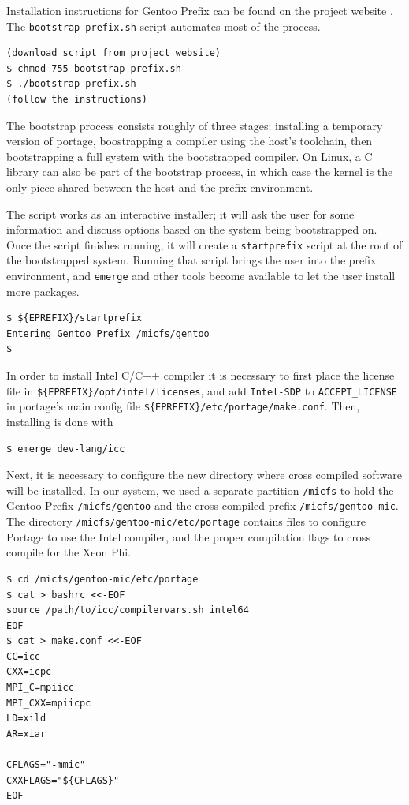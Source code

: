\documentclass[a4paper,conference]{IEEEtran}
\begin{document}
Installation instructions for Gentoo Prefix can be found on the project
website \cite{gentoo:prefix}. The \texttt{bootstrap-prefix.sh} script
automates most of the process.
\begin{verbatim}
(download script from project website)
$ chmod 755 bootstrap-prefix.sh
$ ./bootstrap-prefix.sh
(follow the instructions)
\end{verbatim}

The bootstrap process consists roughly of three stages: installing a
temporary version of portage, boostrapping a compiler using the host's
toolchain, then bootstrapping a full system with the bootstrapped
compiler. On Linux, a C library can also be part of the bootstrap
process, in which case the kernel is the only piece shared between the
host and the prefix environment.

The script works as an interactive installer; it will ask the user for
some information and discuss options based on the system being
bootstrapped on. Once the script finishes running, it will create a
\texttt{startprefix} script at the root of the bootstrapped system.
Running that script brings the user into the prefix environment, and
\texttt{emerge} and other tools become available to let the user install
more packages.
\begin{verbatim}
$ ${EPREFIX}/startprefix
Entering Gentoo Prefix /micfs/gentoo
$
\end{verbatim}
In order to install Intel C/C++ compiler it is necessary to first place
the license file in \verb|${EPREFIX}/opt/intel/licenses|, and add
\verb|Intel-SDP| to \verb|ACCEPT_LICENSE| in portage's main config file
\verb|${EPREFIX}/etc/portage/make.conf|. Then, installing is done with
\begin{verbatim}
$ emerge dev-lang/icc
\end{verbatim}

Next, it is necessary to configure the new directory where cross
compiled software will be installed. In our system, we used a separate
partition \verb|/micfs| to hold the Gentoo Prefix \verb|/micfs/gentoo|
and the cross compiled prefix \verb|/micfs/gentoo-mic|. The directory
\verb|/micfs/gentoo-mic/etc/portage| contains files to configure Portage
to use the Intel compiler, and the proper compilation flags to cross
compile for the Xeon Phi.

\begin{verbatim}
$ cd /micfs/gentoo-mic/etc/portage
$ cat > bashrc <<-EOF
source /path/to/icc/compilervars.sh intel64
EOF
$ cat > make.conf <<-EOF
CC=icc
CXX=icpc
MPI_C=mpiicc
MPI_CXX=mpiicpc
LD=xild
AR=xiar

CFLAGS="-mmic"
CXXFLAGS="${CFLAGS}"
EOF
\end{verbatim}
\end{document}
